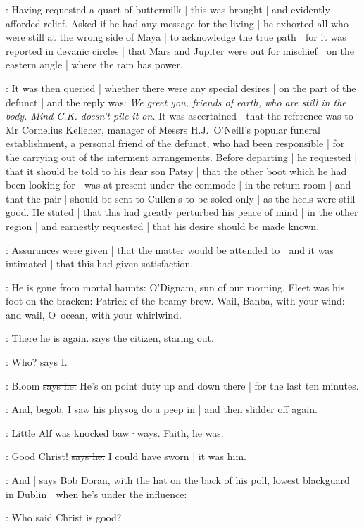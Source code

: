 :
Having requested a quart of buttermilk |
this was brought |
and evidently afforded relief.
Asked if he had any message for the living |
he exhorted all who were still at the wrong side of Maya |
to acknowledge the true path |
for it was reported in devanic circles |
that Mars and Jupiter were out for mischief |
on the eastern angle |
where the ram has power.%

:
It was then queried |
whether there were any special desires |
on the part of the defunct |
and the reply was:
\emph{We greet you,
friends of earth,
who are still in the body.
Mind C.K. doesn't pile it on.}
It was ascertained |
that the reference was to Mr Cornelius Kelleher,
manager of Messrs H.J.~O'Neill's popular funeral establishment,
a personal friend of the defunct,
who had been responsible |
for the carrying out of the interment arrangements.
Before departing |
he requested |
that it should be told to his dear son Patsy |
that the other boot which he had been looking for |
was at present under the commode |
in the return room |
and that the pair |
should be sent to Cullen's to be soled only |
as the heels were still good.%
He stated |
that this had greatly perturbed his peace of mind |
in the other region |
and earnestly requested |
that his desire should be made known.

:
Assurances were given |
that the matter would be attended to |
and it was intimated |
that this had given satisfaction.

:
He is gone from mortal haunts:
O'Dignam,
sun of our morning.
Fleet was his foot on the bracken:
Patrick of the beamy brow.
Wail,
Banba,
with your wind:
and wail,
O~ocean,
with your whirlwind.

\citizen:
There he is again.
\sout{says the citizen,
staring out.}

:
Who?
\sout{says I.}

\citizen:
Bloom
\sout{says he.}
He's on point duty up and down there |
for the last ten minutes.%

\Nq:
And,
begob,
I saw his physog do a peep in |
and then slidder off again.

\Nq:
Little Alf was knocked baw·ways.
Faith,
he was.

\bergan:
Good Christ!
\sout{says he.}
I could have sworn |
it was him.

\Nq:
And |
says Bob Doran,
with the hat on the back of his poll,
lowest blackguard in Dublin |
when he's under the influence:

\doran:
Who said Christ is good?

